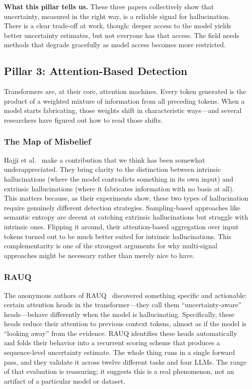 \documentclass[journal]{IEEEtran}
\begin{document}
\textbf{What this pillar tells us.} These three papers collectively show that uncertainty, measured in the right way, is a reliable signal for hallucination. There is a clear trade-off at work, though: deeper access to the model yields better uncertainty estimates, but not everyone has that access. The field needs methods that degrade gracefully as model access becomes more restricted.

\subsection{Pillar 3: Attention-Based Detection}

Transformers are, at their core, attention machines. Every token generated is the product of a weighted mixture of information from all preceding tokens. When a model starts fabricating, those weights shift in characteristic ways---and several researchers have figured out how to read those shifts.

\subsubsection{The Map of Misbelief}
Hajji et al.~\cite{map_misbelief} make a contribution that we think has been somewhat underappreciated. They bring clarity to the distinction between intrinsic hallucinations (where the model contradicts something in its own input) and extrinsic hallucinations (where it fabricates information with no basis at all). This matters because, as their experiments show, these two types of hallucination require genuinely different detection strategies. Sampling-based approaches like semantic entropy are decent at catching extrinsic hallucinations but struggle with intrinsic ones. Flipping it around, their attention-based aggregation over input tokens turned out to be much better suited for intrinsic hallucinations. This complementarity is one of the strongest arguments for why multi-signal approaches might be necessary rather than merely nice to have.

\subsubsection{RAUQ}
The anonymous authors of RAUQ~\cite{rauq} discovered something specific and actionable: certain attention heads in the transformer---they call them ``uncertainty-aware'' heads---behave differently when the model is hallucinating. Specifically, these heads reduce their attention to previous context tokens, almost as if the model is ``looking away'' from the evidence. RAUQ identifies these heads automatically and folds their behavior into a recurrent scoring scheme that produces a sequence-level uncertainty estimate. The whole thing runs in a single forward pass, and they validate it across twelve different tasks and four LLMs. The range of that evaluation is reassuring; it suggests this is a real phenomenon, not an artifact of a particular model or dataset.
\end{document}
